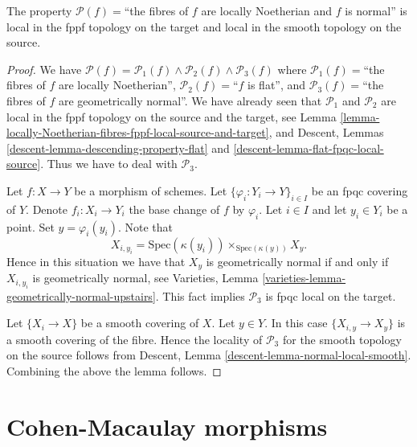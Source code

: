 \begin{lemma}
\label{lemma-normal-fppf-local-source-and-target}
The property
$\mathcal{P}(f)=$``the fibres of $f$ are locally Noetherian and $f$ is normal''
is local in the fppf topology on the target and
local in the smooth topology on the source.
\end{lemma}

\begin{proof}
We have
$\mathcal{P}(f) =
\mathcal{P}_1(f) \wedge \mathcal{P}_2(f) \wedge \mathcal{P}_3(f)$
where
$\mathcal{P}_1(f)=$``the fibres of $f$ are locally Noetherian'',
$\mathcal{P}_2(f)=$``$f$ is flat'', and
$\mathcal{P}_3(f)=$``the fibres of $f$ are geometrically normal''.
We have already seen that $\mathcal{P}_1$ and $\mathcal{P}_2$
are local in the fppf topology on the source and the target, see
Lemma \ref{lemma-locally-Noetherian-fibres-fppf-local-source-and-target},
and Descent, Lemmas \ref{descent-lemma-descending-property-flat} and
\ref{descent-lemma-flat-fpqc-local-source}. Thus we have to deal
with $\mathcal{P}_3$.

\medskip\noindent
Let $f : X \to Y$ be a morphism of schemes.
Let $\{\varphi_i : Y_i \to Y\}_{i \in I}$ be an fpqc covering of $Y$.
Denote $f_i : X_i \to Y_i$ the base change of $f$ by $\varphi_i$.
Let $i \in I$ and let $y_i \in Y_i$ be a point.
Set $y = \varphi_i(y_i)$. Note that
$$
X_{i, y_i} = \text{Spec}(\kappa(y_i)) \times_{\text{Spec}(\kappa(y))} X_y.
$$
Hence in this situation we have that $X_y$ is geometrically normal if and
only if $X_{i, y_i}$ is geometrically normal, see
Varieties, Lemma \ref{varieties-lemma-geometrically-normal-upstairs}.
This fact implies $\mathcal{P}_3$ is fpqc local on the target.

\medskip\noindent
Let $\{X_i \to X\}$ be a smooth covering of $X$.
Let $y \in Y$. In this case $\{X_{i, y} \to X_y\}$ is a
smooth covering of the fibre. Hence the locality of $\mathcal{P}_3$
for the smooth topology on the source follows from
Descent, Lemma \ref{descent-lemma-normal-local-smooth}.
Combining the above the lemma follows.
\end{proof}









\section{Cohen-Macaulay morphisms}
\label{section-CM}

